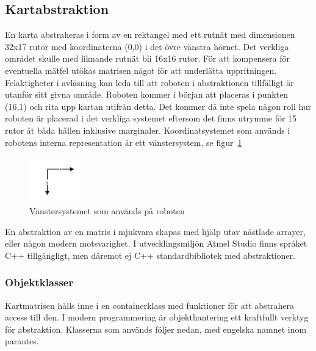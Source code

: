 \documentclass[a4paper,12pt,fleqn]{article}
\begin{document}
\subsection{Kartabstraktion}


En karta abstraheras i form av en rektangel med ett rutnät med dimensionen 32x17 rutor med koordinaterna (0,0) i det övre vänstra hörnet. Det verkliga området skulle med liknande rutnät bli 16x16 rutor. För att kompensera för eventuella mätfel utökas matrisen något för att underlätta uppritningen. Felaktigheter i avläsning kan leda till att roboten i abstraktionen tillfälligt är utanför sitt givna område. Roboten kommer i början att placeras i punkten (16,1) och rita upp kartan utifrån detta. Det kommer då inte spela någon roll hur roboten är placerad i det verkliga systemet eftersom det finns utrymme för 15 rutor åt båda hållen inklusive marginaler. Koordinatsystemet som används i robotens interna representation är ett vänstersystem, se figur~\ref{fig:coor}

\begin{figure}[htp] %
  \begin{center}
  \includegraphics[keepaspectratio=true,width=0.2\textwidth]{coor.jpg}  %
  \end{center}
  \caption{Vänstersystemet som används på roboten} %
  \label{fig:coor}
\end{figure}

En abstraktion av en matris i mjukvara skapas med hjälp utav nästlade arrayer, eller någon modern motsvarighet. I utvecklingsmiljön Atmel Studio finns språket C++ tillgängligt, men däremot ej C++ standardbibliotek med abstraktioner.

\subsubsection{Objektklasser}

Kartmatrisen hålls inne i en containerklass med funktioner för att abstrahera access till den. I modern programmering är objekthantering ett kraftfullt verktyg för abstraktion. Klasserna som används följer nedan, med engelska namnet inom parantes.
\end{document}
